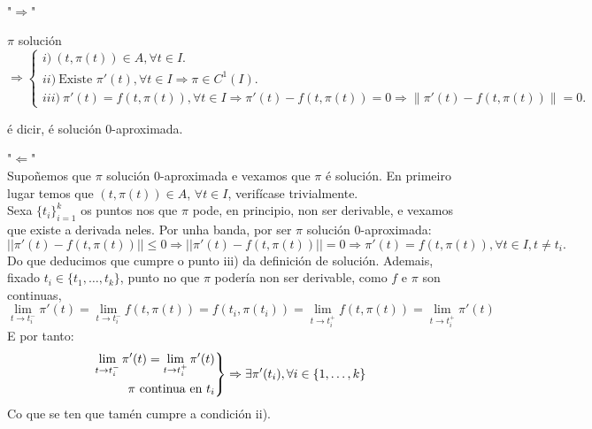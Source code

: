 \documentclass[11pt, a4paper,twoside]{article}
\makeatletter
\theoremstyle{theorem-style}  %
\renewenvironment{proof}[1][\proofname]{\par
	\pushQED{\qed}%
	\normalfont \topsep6\p@\@plus6\p@\relax
	\list{}{%
		\settowidth{\leftmargin}{\quad:\hskip\labelsep}%
		\setlength{\labelwidth}{0pt}%
		\setlength{\itemindent}{-\leftmargin}%
	}%
	\item[\hskip\labelsep\itshape#1\@addpunct{:}]\ignorespaces
}{%
	\popQED\endlist\@endpefalse
}
\theoremstyle{definition-style}
\theoremstyle{example-style}
\providecommand{\norm}[1]{\left\lVert#1\right\rVert} %
\newenvironment{rcases}
{\left.\begin{aligned}}
	{\end{aligned}\right\rbrace}
\makeatother
\begin{document}
\begin{proof}\ \\
	"$ \Rightarrow $"
	
	$ \pi $	solución $\Rightarrow \begin{cases}
	i)\  (t, \pi (t)) \in A, \forall t \in I.\\
	ii)\  \text{Existe }  \pi' (t), \forall t \in I \Rightarrow \pi \in C^1(I). \\
	iii)\  \pi'(t)=f(t, \pi(t)),  \forall t \in I \Rightarrow \pi'(t)-f(t, \pi(t))=0 \Rightarrow \norm{\pi'(t)-f(t, \pi(t))}=0.
	\end{cases}$ 
	
	é dicir, é solución 0-aproximada.
	
	"$ \Leftarrow $" \\Supoñemos que $ \pi $ solución 0-aproximada e vexamos que $ \pi $ é solución. En primeiro lugar temos que $(t, \pi (t)) \in A$, $\forall t \in I$, verifícase trivialmente. \\
	Sexa $ \{t_i\}_{i=1}^k $ os puntos nos que $ \pi $ pode, en principio, non ser derivable, e vexamos que existe a derivada neles. Por unha banda, por ser  $ \pi $ solución 0-aproximada:
	 \[ ||\pi'(t)-f(t,\pi(t))||\leq 0\Rightarrow ||\pi'(t)-f(t,\pi(t))||=0 \Rightarrow \pi'(t)=f(t, \pi(t)), \forall t \in I, t\neq t_i.\]
	Do que deducimos que cumpre o punto iii) da definición de solución. Ademais, fixado $ t_i\in \{t_1, \dots, t_k\} $, punto no que $ \pi $ podería non ser derivable, como $ f $ e $ \pi $ son continuas, 
	\[ \lim\limits_{t\rightarrow t_i^-}\pi'(t)=\lim\limits_{t\rightarrow t_i^-} f(t, \pi(t))= f(t_i, \pi(t_i))= \lim\limits_{t\rightarrow t_i^+} f(t, \pi(t))=\lim\limits_{t\rightarrow t_i^+}\pi'(t)\]
	E por tanto:
	\[ \begin{rcases}
	\lim\limits_{t\rightarrow t_i^-}\pi'(t)=\lim\limits_{t\rightarrow t_i^+}\pi'(t) \\
	\pi \text{ continua en } t_i
	\end{rcases}\Rightarrow \exists \pi'(t_i), \forall i \in \{1,\dots,k \} \]
	Co que se ten que tamén cumpre a condición ii).	
\end{proof}
\end{document}

